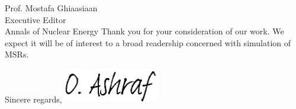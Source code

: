 \documentclass[10.5pt]{letter} %
\newcommand{\RecipientName}{Prof. Mostafa Ghiaasiaan\xspace}
\newcommand{\RecipientAddress}{Executive Editor\\Annals of Nuclear Energy}
\begin{document}
\begin{letter}{\RecipientName\\
			\RecipientAddress\xspace}
		Thank you for your consideration of our work. We expect it will be of interest
		to a broad readership concerned with simulation of MSRs.\\
		
		
		\closing{Sincere regards,
	\includegraphics[height=1.5cm]{signature.png}\\
}


\end{letter}
\end{document}
